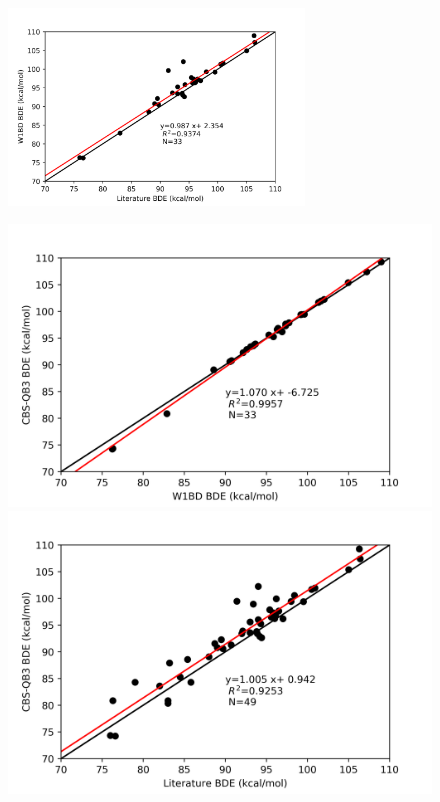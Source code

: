 \begin{figure}
  \centering
  \includegraphics[width=0.7\textwidth]{figures/lit-w1bd}
\end{figure}


\begin{figure}
\centering
\begin{minipage}{8cm}
  \centering
  \includegraphics[width=\textwidth]{figures/w1bd-cbsqb3}
\end{minipage}%
\begin{minipage}{8cm}
  \centering
  \includegraphics[width=\textwidth]{figures/lit-cbsqb3}
\end{minipage}
\end{figure}

